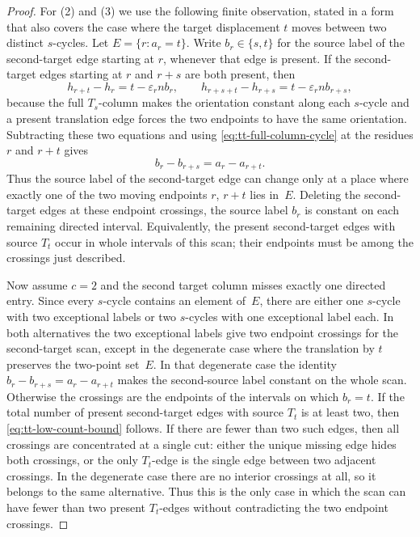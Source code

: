 \documentclass{amsart}
\theoremstyle{definition}
\theoremstyle{remark}
\begin{document}
\begin{proof}
For (2) and (3) we use the following finite observation, stated in a
form that also covers the case where the target displacement \(t\) moves
between two distinct \(s\)-cycles.  Let
\(E=\{r:a_r=t\}\).  Write \(b_r\in\{s,t\}\) for the source label of the
second-target edge starting at \(r\), whenever that edge is present.
If the second-target edges starting at \(r\) and \(r+s\) are both
present, then
\[
  h_{r+t}-h_r=t-\varepsilon_r n b_r,
  \qquad
  h_{r+s+t}-h_{r+s}=t-\varepsilon_r n b_{r+s},
\]
because the full \(T_s\)-column makes the orientation constant along
each \(s\)-cycle and a present translation edge forces the two endpoints
to have the same orientation.  Subtracting these two equations and using
\eqref{eq:tt-full-column-cycle} at the residues \(r\) and \(r+t\) gives
\[
  b_r-b_{r+s}=a_r-a_{r+t}.
\]
Thus the source label of the second-target edge can change only at a
place where exactly one of the two moving endpoints \(r\), \(r+t\) lies
in~\(E\).  Deleting the second-target edges at these endpoint crossings,
the source label \(b_r\) is constant on each remaining directed interval.
Equivalently, the present second-target edges with source \(T_t\) occur
in whole intervals of this scan; their endpoints must be among the
crossings just described.

Now assume \(c=2\) and the second target column misses exactly one
directed entry.  Since every \(s\)-cycle contains an element of~\(E\),
there are either one \(s\)-cycle with two exceptional labels or two
\(s\)-cycles with one exceptional label each.  In both alternatives the
two exceptional labels give two endpoint crossings for the
second-target scan, except in the degenerate case where the translation
by \(t\) preserves the two-point set~\(E\).  In that degenerate case the
identity \(b_r-b_{r+s}=a_r-a_{r+t}\) makes the second-source label
constant on the whole scan.  Otherwise the crossings are the endpoints
of the intervals on which \(b_r=t\).  If the total number of present
second-target edges with source \(T_t\) is at least two, then
\eqref{eq:tt-low-count-bound} follows.  If there are fewer than two such
edges, then all crossings are concentrated at a single cut: either the
unique missing edge hides both crossings, or the only \(T_t\)-edge is the
single edge between two adjacent crossings.  In the degenerate case there
are no interior crossings at all, so it belongs to the same alternative.
Thus this is the only case in which the scan can have fewer than two
present \(T_t\)-edges without contradicting the two endpoint crossings.


\end{proof}
\end{document}
